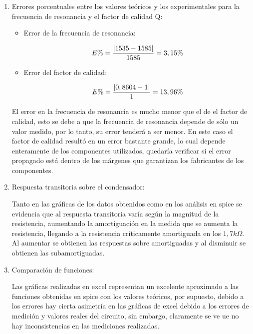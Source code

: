 \documentclass[12pt]{article}
\begin{document}
    \begin{enumerate}
    	\item Errores porcentuales entre los valores teóricos y los experimentales para la frecuencia de resonancia y el factor de calidad Q:
    	
    	\begin{itemize}
    		\item Error de la frecuencia de resonancia:
    		
    		\begin{equation}
    			\notag E\% = \frac{|1535 - 1585|}{1585} = 3,15\%
    		\end{equation}
    		
    		\item Error del factor de calidad:
    		
    		\begin{equation}
    			\notag E\% = \frac{|0,8604 - 1|}{1} = 13,96\%
    		\end{equation}
    		
    	\end{itemize}
    	
    	\noindent El error en la frecuencia de resonancia es mucho menor que el de el factor de calidad, esto se debe a que la frecuencia de resonancia depende de sólo un valor medido, por lo tanto, su error tenderá a ser menor. En este caso el factor de calidad resultó en un error bastante grande, lo cual depende enteramente de los componentes utilizados, quedaría verificar si el error propagado está dentro de los márgenes que garantizan los fabricantes de los componentes.
    	
    	\item Respuesta transitoria sobre el condensador:
    	
    	\noindent Tanto en las gráficas de los datos obtenidos como en los análisis en spice se evidencia que al respuesta transitoria varía según la magnitud de la resistencia, aumentando la amortiguación en la medida que se aumenta la resistencia, llegando a la resistencia críticamente amortiguada en los $1,7k\Omega$. Al aumentar se obtienen las respuestas sobre amortiguadas y al disminuir se obtienen las subamortiguadas.
    	
    	\item Comparación de funciones:
    	
    	\noindent Las gráficas realizadas en excel representan un excelente aproximado a las funciones obtenidas en spice con los valores teóricos, por supuesto, debido a los errores hay cierta asimetría en las gráficas de excel debido a los errores de medición y valores reales del circuito, sin embargo, claramente se ve ue no hay inconsistencias en las mediciones realizadas.
    	

\end{enumerate}
\end{document}
